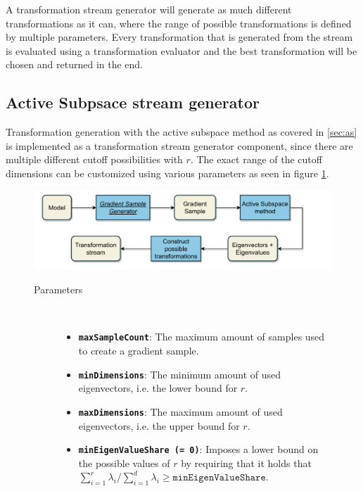 \documentclass[
  a4paper,  %
  twoside,  %
  bibliography=totoc,
  headsepline,
  cleardoublepage=empty,
  parskip=half,
  draft=false
]{scrbook}
\begin{document}
A transformation stream generator will generate as much different transformations as it can, where the range of possible transformations is defined by multiple parameters.
Every transformation that is generated from the stream is evaluated using a transformation evaluator and the best transformation will be chosen and returned in the end.

\newpage

\subsection{Active Subpsace stream generator}

Transformation generation with the active subspace method as covered in \cref{sec:as} is implemented as a transformation stream generator component, since there are multiple different cutoff possibilities with $r$.
The exact range of the cutoff dimensions can be customized using various parameters as seen in figure \cref{fig:astsg}.

\begin{mdframed}[style=style,frametitle={Transformation stream generator (active subspaces)}]
\begin{figure}[H]
\vspace{5px}
\includegraphics[width=\textwidth]{graphics/TransformationStreamGen_AS.pdf}

\delimit

\begin{description}
\item[Parameters] {~ \begin{itemize}[\indent{}]
\item \texttt{\textbf{maxSampleCount}}: The maximum amount of samples used to create a gradient sample.
\item \texttt{\textbf{minDimensions}}: The minimum amount of used eigenvectors, i.e. the lower bound for $r$.
\item \texttt{\textbf{maxDimensions}}: The maximum amount of used eigenvectors, i.e. the upper bound for $r$.
\item \texttt{\textbf{minEigenValueShare (= 0)}}: Imposes a lower bound on the possible values of $r$ by requiring that it holds that $\sum_{i=1}^r \lambda_i / \sum_{i=1}^d \lambda_i \geq \texttt{minEigenValueShare}$.
\end{itemize}}
\end{description}
\delimit
{}
\label{fig:astsg}
\end{figure}
\end{mdframed}
\end{document}
